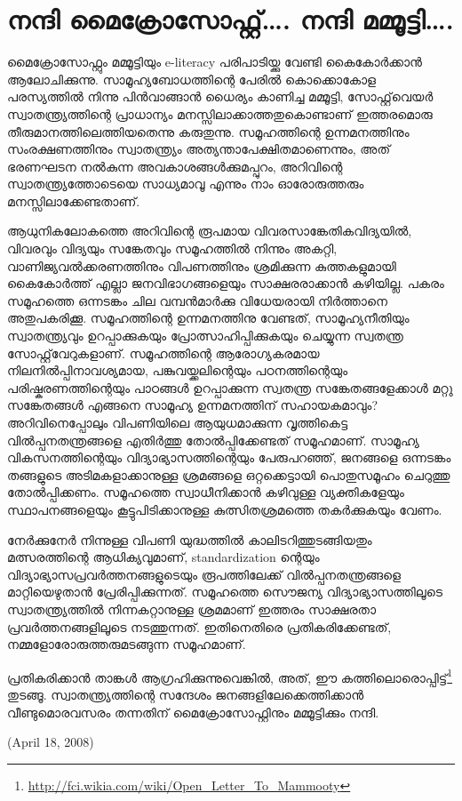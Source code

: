 \section*{നന്ദി മൈക്രോസോഫ്റ്റ്…. നന്ദി മമ്മൂട്ടി….}
\vskip 2pt

മൈക്രോസോഫ്റ്റും മമ്മൂട്ടിയും e-literacy പരിപാടിയ്ക്കു വേണ്ടി കൈകോര്‍ക്കാന്‍ ആലോചിക്കുന്നു. സാമൂഹ്യബോധത്തിന്റെ പേരില്‍ കൊക്കൊകോള പരസ്യത്തില്‍ നിന്നു പിന്‍വാങ്ങാന്‍ ധൈര്യം കാണിച്ച മമ്മൂട്ടി, സോഫ്റ്റ്‌വെയര്‍ സ്വാതന്ത്ര്യത്തിന്റെ പ്രാധാന്യം മനസ്സിലാക്കാത്തതുകൊണ്ടാണ് ഇത്തരമൊരു തീരുമാനത്തിലെത്തിയതെന്നു കരുതുന്നു. സമൂഹത്തിന്റെ ഉന്നമനത്തിനും സംരക്ഷണത്തിനും സ്വാതന്ത്ര്യം അത്യന്താപേക്ഷിതമാണെന്നും, അത് ഭരണഘടന നല്‍കുന്ന അവകാശങ്ങള്‍ക്കുമപ്പുറം, അറിവിന്റെ സ്വാതന്ത്ര്യത്തോടെയെ സാധ്യമാവൂ എന്നും നാം ഓരോരുത്തരും മനസ്സിലാക്കേണ്ടതാണ്.

ആധുനികലോകത്തെ അറിവിന്റെ രൂപമായ വിവരസാങ്കേതികവിദ്യയില്‍, വിവരവും വിദ്യയും സങ്കേതവും സമൂഹത്തില്‍ നിന്നും അകറ്റി, വാണിജ്യവല്‍ക്കരണത്തിനും വിപണത്തിനും ശ്രമിക്കുന്ന കുത്തകളുമായി കൈകോര്‍ത്ത് എല്ലാ ജനവിഭാഗങ്ങളെയും സാക്ഷരരാക്കാന്‍ കഴിയില്ല. പകരം സമൂഹത്തെ ഒന്നടങ്കം ചില വമ്പന്‍മാര്‍ക്കു വിധേയരായി നിര്‍ത്താനെ അതുപകരിക്കൂ. സമൂഹത്തിന്റെ ഉന്നമനത്തിനു വേണ്ടത്, സാമൂഹ്യനീതിയും സ്വാതന്ത്ര്യവും ഉറപ്പാക്കുകയും പ്രോത്സാഹിപ്പിക്കുകയും ചെയ്യുന്ന സ്വതന്ത്ര സോഫ്റ്റ്‌വേറുകളാണ്. സമൂഹത്തിന്റെ ആരോഗ്യകരമായ നിലനില്‍പ്പിനാവശ്യമായ, പങ്കുവയ്ക്കലിന്റെയും പഠനത്തിന്റെയും പരിഷ്കരണത്തിന്റെയും പാഠങ്ങള്‍ ഉറപ്പാക്കുന്ന സ്വതന്ത്ര സങ്കേതങ്ങളേക്കാള്‍ മറ്റു സങ്കേതങ്ങള്‍ എങ്ങനെ സാമൂഹ്യ ഉന്നമനത്തിന് സഹായകമാവും? അറിവിനെപ്പോലും വിപണിയിലെ ആയുധമാക്കുന്ന വൃത്തികെട്ട വില്‍പ്പനതന്ത്രങ്ങളെ എതിര്‍ത്തു തോല്‍പ്പിക്കേണ്ടത് സമൂഹമാണ്. സാമൂഹ്യ വികസനത്തിന്റെയും വിദ്യാഭ്യാസത്തിന്റെയും പേരുപറഞ്ഞ്, ജനങ്ങളെ ഒന്നടങ്കം തങ്ങളുടെ അടിമകളാക്കാനുള്ള ശ്രമങ്ങളെ ഒറ്റക്കെട്ടായി പൊതുസമൂഹം ചെറുത്തു തോല്‍പ്പിക്കണം. സമൂഹത്തെ സ്വാധീനിക്കാന്‍ കഴിവുള്ള വ്യക്തികളേയും സ്ഥാപനങ്ങളെയും കൂട്ടുപിടിക്കാനുള്ള കുത്സിതശ്രമത്തെ തകര്‍ക്കുകയും വേണം.

നേര്‍ക്കുനേര്‍ നിന്നുള്ള വിപണി യുദ്ധത്തില്‍ കാലിടറിത്തുടങ്ങിയതും മത്സരത്തിന്റെ ആധിക്യവുമാണ്, standardization ന്റെയും വിദ്യാഭ്യാസപ്രവര്‍ത്തനങ്ങളുടെയും രൂപത്തിലേക്ക് വില്‍പ്പനതന്ത്രങ്ങളെ മാറ്റിയെഴുതാന്‍ പ്രേരിപ്പിക്കുന്നത്. സമൂഹത്തെ സൌജന്യ വിദ്യാഭ്യാസത്തിലൂടെ സ്വാതന്ത്ര്യത്തില്‍ നിന്നകറ്റാനുള്ള ശ്രമമാണ് ഇത്തരം സാക്ഷരതാ പ്രവര്‍ത്തനങ്ങളിലൂടെ നടത്തുന്നത്. ഇതിനെതിരെ പ്രതികരിക്കേണ്ടത്, നമ്മളോരോരുത്തരുമടങ്ങുന്ന സമൂഹമാണ്.

പ്രതികരിക്കാന്‍ താങ്കള്‍ ആഗ്രഹിക്കുന്നുവെങ്കില്‍, അത്, ഈ കത്തിലൊരൊപ്പിട്ട്\footnote{\url{http://fci.wikia.com/wiki/Open_Letter_To_Mammooty}} തുടങ്ങൂ. സ്വാതന്ത്ര്യത്തിന്റെ സന്ദേശം ജനങ്ങളിലേക്കെത്തിക്കാന്‍ വീണ്ടുമൊരവസരം തന്നതിന് മൈക്രോസോഫ്റ്റിനും മമ്മൂട്ടിക്കും നന്ദി.

(April 18, 2008)
\newpage
